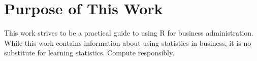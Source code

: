 %
%
%
%
%

\section{Purpose of This Work}

This work strives to be a practical guide to using R for business 
administration. While this work contains information about using statistics 
in business, it is no substitute for learning statistics. Compute responsibly.